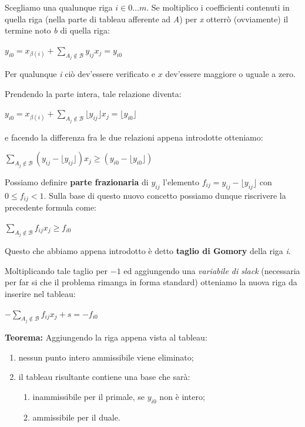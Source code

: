 \documentclass[11pt]{book}
\begin{document}
Scegliamo una qualunque riga $i \in 0 \dots m$. Se moltiplico i
coefficienti contenuti in quella riga (nella parte di tableau
afferente ad {\em A}) per {\em x} otterr\`o (ovviamente) il termine
noto {\em b} di quella riga:

\begin{center}
$y_{i0} = x_{\beta(i)} + \sum\limits_{A_j \not\in \mathcal{B}} y_{ij}x_j = y_{i0}$  
\end{center}

Per qualunque {\em i} ci\`o dev'essere verificato e $x$ dev'essere
maggiore o uguale a zero. 

Prendendo la parte intera, tale relazione diventa:

\begin{center}
$y_{i0} = x_{\beta(i)} + \sum\limits_{A_j \not\in \mathcal{B}} \lfloor y_{ij}
  \rfloor x_j = \lfloor y_{i0} \rfloor$
\end{center}

e facendo la differenza fra le due relazioni appena introdotte
otteniamo:

\begin{center}
  $\sum\limits_{A_j \not\in \mathcal{B}} (y_{ij} - \lfloor y_{ij} \rfloor) x_j
  \geq (y_{i0} - \lfloor y_{i0} \rfloor)$
\end{center}

Possiamo definire {\bf parte frazionaria} di $y_{ij}$ l'elemento
$f_{ij} = y_{ij} - \lfloor y_{ij} \rfloor$ con $0 \leq f_{ij} <
1$. Sulla base di questo nuovo concetto possiamo dunque riscrivere la
precedente formula come:

\begin{center}
$\sum\limits_{A_j \not\in \mathcal{B}} f_{ij}x_j \geq f_{i0}$  
\end{center}

Questo che abbiamo appena introdotto \`e detto {\bf taglio di Gomory}
della riga {\em i}.

Moltiplicando tale taglio per $-1$ ed aggiungendo una {\em variabile
  di slack} (necessaria per far si che il problema rimanga in forma
standard) otteniamo la nuova riga da inserire nel tableau:

\begin{center}
$-\sum\limits_{A_j \not\in \mathcal{B}} f_{ij}x_j + s = - f_{i0}$  
\end{center}

{\bf Teorema:} Aggiungendo la riga appena vista al tableau:

\begin{enumerate}
\item nessun punto intero ammissibile viene eliminato;
\item il tableau risultante contiene una base che sar\`a:

  \begin{enumerate}
  \item inammissibile per il primale, se $y_{i0}$ non \`e intero;
  \item ammissibile per il duale.
  \end{enumerate}

\end{enumerate}
\end{document}
